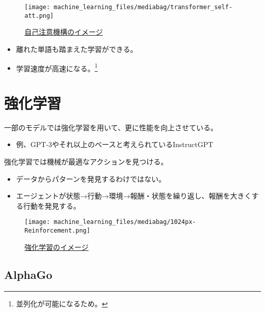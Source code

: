 \documentclass[
  xelatex,
  ja=standard]{bxjsarticle}
\providecommand{\tightlist}{%
  \setlength{\itemsep}{0pt}\setlength{\parskip}{0pt}}\usepackage{longtable,booktabs,array}
\begin{document}
\begin{figure}[htpb]

{\centering \texttt{[image: machine\_learning\_files/mediabag/transformer\_self-att.png]}

}

\caption{\href{https://jalammar.github.io/illustrated-transformer/}{自己注意機構のイメージ}}

\end{figure}

\begin{itemize}
\tightlist
\item
  離れた単語も踏まえた学習ができる。
\item
  学習速度が高速になる。\footnote{並列化が可能になるため。}
\end{itemize}

\hypertarget{ux5f37ux5316ux5b66ux7fd2}{%
\section{強化学習}\label{ux5f37ux5316ux5b66ux7fd2}}

一部のモデルでは強化学習を用いて、更に性能を向上させている。

\begin{itemize}
\tightlist
\item
  例、GPT-3やそれ以上のベースと考えられているInstructGPT
\end{itemize}

強化学習では機械が最適なアクションを見つける。

\begin{itemize}
\tightlist
\item
  データからパターンを発見するわけではない。
\item
  エージェントが状態→行動→環境→報酬・状態を繰り返し、報酬を大きくする行動を発見する。
\end{itemize}

\begin{figure}[htpb]

{\centering \texttt{[image: machine\_learning\_files/mediabag/1024px-Reinforcement.png]}

}

\caption{\href{https://commons.wikimedia.org/wiki/File:Reinforcement_learning_diagram.svg}{強化学習のイメージ}}

\end{figure}

\hypertarget{alphago}{%
\subsection{AlphaGo}\label{alphago}}
\end{document}
